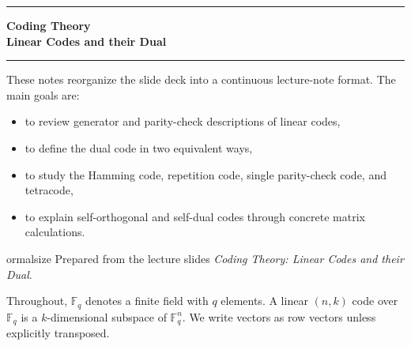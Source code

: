 \documentclass[11pt]{article}
\theoremstyle{definition}
\theoremstyle{remark}
\newcommand{\F}{\mathbb{F}}
\begin{document}
\begin{titlepage}
\centering
\vspace*{2cm}

{\color{accent}\rule{0.82\textwidth}{1.2pt}}\par
\vspace{0.8cm}
{
  \Huge\bfseries Coding Theory\\[0.35em]
  \LARGE Linear Codes and their Dual
}\par
\vspace{0.8cm}
{\color{accent}\rule{0.82\textwidth}{1.2pt}}\par
\vspace{1.2cm}

\begin{tcolorbox}[
  width=0.86\textwidth,
  colback=softaccent,
  colframe=accent!65,
  boxrule=0.8pt,
  arc=2mm,
  left=8pt,right=8pt,top=8pt,bottom=8pt
]
\large
These notes reorganize the slide deck into a continuous lecture-note format. The main goals are:
\begin{itemize}[leftmargin=1.4em,itemsep=0.35em,topsep=0.35em]
    \item to review generator and parity-check descriptions of linear codes,
    \item to define the dual code in two equivalent ways,
    \item to study the Hamming code, repetition code, single parity-check code, and tetracode,
    \item to explain self-orthogonal and self-dual codes through concrete matrix calculations.
\end{itemize}
\end{tcolorbox}

\vfill
{
ormalsize Prepared from the lecture slides \emph{Coding Theory: Linear Codes and their Dual}.}

\end{titlepage}

\tableofcontents
\vspace{0.8em}

\begin{tcolorbox}[
  colback=softgray,
  colframe=rulegray,
  boxrule=0.6pt,
  arc=1.5mm,
  left=8pt,right=8pt,top=6pt,bottom=6pt,
  title=Notation,
  coltitle=black,
  fonttitle=\bfseries
]
Throughout, $\F_q$ denotes a finite field with $q$ elements. A linear $(n,k)$ code over $\F_q$ is a $k$-dimensional subspace of $\F_q^n$. We write vectors as row vectors unless explicitly transposed.
\end{tcolorbox}
\end{document}
